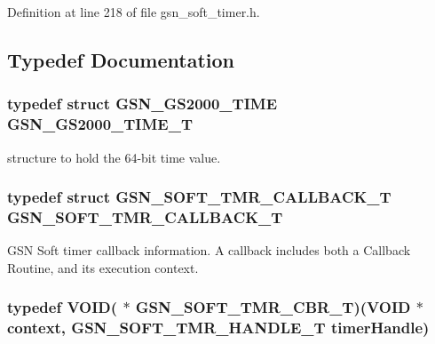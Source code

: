 Definition at line 218 of file gsn\_\-soft\_\-timer.h.



\subsection{Typedef Documentation}
\hypertarget{a00673_gac2ea272727157e0cb9e61106986796ab}{
\subsubsection[{GSN\_\-GS2000\_\-TIME\_\-T}]{\setlength{\rightskip}{0pt plus 5cm}typedef struct {\bf GSN\_\-GS2000\_\-TIME}  {\bf GSN\_\-GS2000\_\-TIME\_\-T}}}
\label{a00673_gac2ea272727157e0cb9e61106986796ab}


structure to hold the 64-\/bit time value. 

\hypertarget{a00673_ga0f3896e8f6fd92de3aa0d40428ffa23a}{
\subsubsection[{GSN\_\-SOFT\_\-TMR\_\-CALLBACK\_\-T}]{\setlength{\rightskip}{0pt plus 5cm}typedef struct {\bf GSN\_\-SOFT\_\-TMR\_\-CALLBACK\_\-T}  {\bf GSN\_\-SOFT\_\-TMR\_\-CALLBACK\_\-T}}}
\label{a00673_ga0f3896e8f6fd92de3aa0d40428ffa23a}


GSN Soft timer callback information. A callback includes both a Callback Routine, and its execution context. 

\hypertarget{a00673_ga9bb74ab1272c117587bf1fadf84849de}{
\subsubsection[{GSN\_\-SOFT\_\-TMR\_\-CBR\_\-T}]{\setlength{\rightskip}{0pt plus 5cm}typedef VOID( $\ast$ {\bf GSN\_\-SOFT\_\-TMR\_\-CBR\_\-T})(VOID $\ast$context, {\bf GSN\_\-SOFT\_\-TMR\_\-HANDLE\_\-T} timerHandle)}}
\label{a00673_ga9bb74ab1272c117587bf1fadf84849de}


